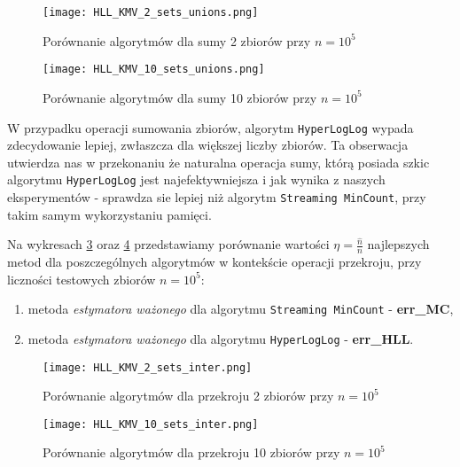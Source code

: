 \begin{figure}[h!]
	\texttt{[image: HLL\_KMV\_2\_sets\_unions.png]}
	\centering
	\caption{Porównanie algorytmów dla sumy 2 zbiorów przy $n=10^5$}
	\label{fig:HLL_KMV_2_sets_unions}
\end{figure}

\begin{figure}[h!]
	\texttt{[image: HLL\_KMV\_10\_sets\_unions.png]}
	\centering
	\caption{Porównanie algorytmów dla sumy 10 zbiorów przy $n=10^5$}
	\label{fig:HLL_KMV_10_sets_unions}
\end{figure}
W przypadku operacji sumowania zbiorów, algorytm \texttt{HyperLogLog} wypada zdecydowanie lepiej, zwłaszcza dla większej liczby zbiorów. Ta obserwacja utwierdza nas w przekonaniu że naturalna operacja sumy, którą posiada szkic algorytmu \texttt{HyperLogLog} jest najefektywniejsza i jak wynika z naszych eksperymentów - sprawdza sie lepiej niż algorytm \texttt{Streaming MinCount}, przy takim samym wykorzystaniu pamięci.

Na wykresach \ref{fig:HLL_KMV_2_sets_inter} oraz \ref{fig:HLL_KMV_10_sets_inter} przedstawiamy porównanie wartości $\eta = \frac{\hat{n}}{n}$ najlepszych metod dla poszczególnych algorytmów w kontekście operacji przekroju, przy liczności testowych zbiorów $n=10^5$:
\begin{enumerate}
	\item metoda \textit{estymatora ważonego} dla algorytmu \texttt{Streaming MinCount} - \textbf{err\_MC},
	\item metoda \textit{estymatora ważonego} dla algorytmu \texttt{HyperLogLog} - \textbf{err\_HLL}.
\end{enumerate}

\begin{figure}[h!]
	\texttt{[image: HLL\_KMV\_2\_sets\_inter.png]}
	\centering
	\caption{Porównanie algorytmów dla przekroju 2 zbiorów przy $n=10^5$}
	\label{fig:HLL_KMV_2_sets_inter}
\end{figure}

\begin{figure}[h!]
	\texttt{[image: HLL\_KMV\_10\_sets\_inter.png]}
	\centering
	\caption{Porównanie algorytmów dla przekroju 10 zbiorów przy $n=10^5$}
	\label{fig:HLL_KMV_10_sets_inter}
\end{figure}

